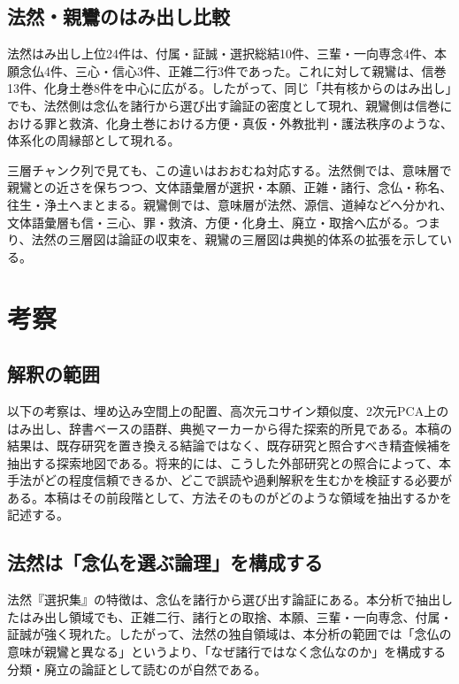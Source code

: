 \documentclass[uplatex,dvipdfmx,11pt,a4paper]{jsarticle}
\begin{document}
\subsection{法然・親鸞のはみ出し比較}

法然はみ出し上位24件は、付属・証誠・選択総結10件、三輩・一向専念4件、本願念仏4件、三心・信心3件、正雑二行3件であった。これに対して親鸞は、信巻13件、化身土巻8件を中心に広がる。したがって、同じ「共有核からのはみ出し」でも、法然側は念仏を諸行から選び出す論証の密度として現れ、親鸞側は信巻における罪と救済、化身土巻における方便・真仮・外教批判・護法秩序のような、体系化の周縁部として現れる。

三層チャンク列で見ても、この違いはおおむね対応する。法然側では、意味層で親鸞との近さを保ちつつ、文体語彙層が選択・本願、正雑・諸行、念仏・称名、往生・浄土へまとまる。親鸞側では、意味層が法然、源信、道綽などへ分かれ、文体語彙層も信・三心、罪・救済、方便・化身土、廃立・取捨へ広がる。つまり、法然の三層図は論証の収束を、親鸞の三層図は典拠的体系の拡張を示している。

\section{考察}

\subsection{解釈の範囲}

以下の考察は、埋め込み空間上の配置、高次元コサイン類似度、2次元PCA上のはみ出し、辞書ベースの語群、典拠マーカーから得た探索的所見である。本稿の結果は、既存研究を置き換える結論ではなく、既存研究と照合すべき精査候補を抽出する探索地図である。将来的には、こうした外部研究との照合によって、本手法がどの程度信頼できるか、どこで誤読や過剰解釈を生むかを検証する必要がある。本稿はその前段階として、方法そのものがどのような領域を抽出するかを記述する。

\subsection{法然は「念仏を選ぶ論理」を構成する}

法然『選択集』の特徴は、念仏を諸行から選び出す論証にある。本分析で抽出したはみ出し領域でも、正雑二行、諸行との取捨、本願、三輩・一向専念、付属・証誠が強く現れた。したがって、法然の独自領域は、本分析の範囲では「念仏の意味が親鸞と異なる」というより、「なぜ諸行ではなく念仏なのか」を構成する分類・廃立の論証として読むのが自然である。
\end{document}
